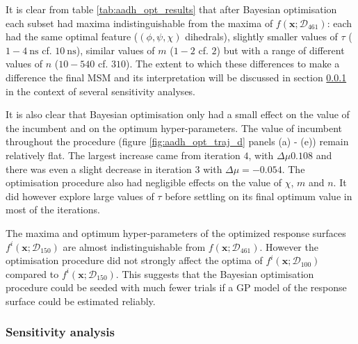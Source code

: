  It is clear from  table \ref{tab:aadh_opt_results} that after Bayesian optimisation each subset had maxima indistinguishable from the maxima of $f(\mathbf{x};\mathcal{D}_{461})$: each had the same optimal feature ($(\phi, \psi, \chi)$ dihedrals), slightly smaller values of $\tau$ ($1 - \SI{4}{\nano\second}$ cf. $\SI{10}{\nano\second}$), similar values of $m$ ($1 - 2$ cf. $2$) but with a range of different values of $n$ ($10 - 540$ cf. $310$). The extent to which these differences to make a difference the final MSM and its interpretation will be discussed in section \ref{subsubsec:sensitivity_analysis} in the context of several sensitivity analyses. 
 
It is also clear that Bayesian optimisation only had a small effect on the value of the incumbent and on the optimum hyper-parameters.  The value of incumbent throughout the procedure (figure \ref{fig:aadh_opt_traj_d} panels (a) - (e)) remain relatively flat. The largest increase came from iteration $4$, with $\Delta \mu 0.108$ and there was even a slight decrease in iteration $3$ with $\Delta \mu = -0.054$. The optimisation procedure also had negligible effects on the value of $\chi$, $m$ and $n$. It did however explore large values of  $\tau$ before settling on its final optimum value in most of the iterations.

The maxima and optimum hyper-parameters of the optimized response surfaces $f^{i}(\mathbf{x};\mathcal{D}_{150})$ are almost indistinguishable from $f(\mathbf{x};\mathcal{D}_{461})$. However the optimisation procedure did not strongly affect the optima of $f^{i}(\mathbf{x};\mathcal{D}_{100})$ compared to $f^{i}(\mathbf{x};\mathcal{D}_{150})$. This suggests that the Bayesian optimisation procedure could be seeded with much fewer trials if a GP model of the response surface could be estimated reliably. 

\subsubsection{Sensitivity analysis}\label{subsubsec:sensitivity_analysis}

